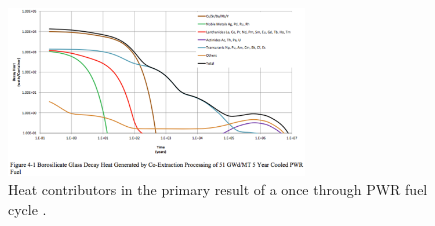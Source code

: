 \begin{figure}[htbp!]
  \begin{center}
    \includegraphics[width=0.7\textwidth]{./images/carter_coex_heat.eps}
  \end{center}
  \caption{Heat contributors in the primary result of a once through PWR fuel 
    cycle \cite{carter_us_2011}.}
  \label{fig:carter_coex_heat}
\end{figure}
